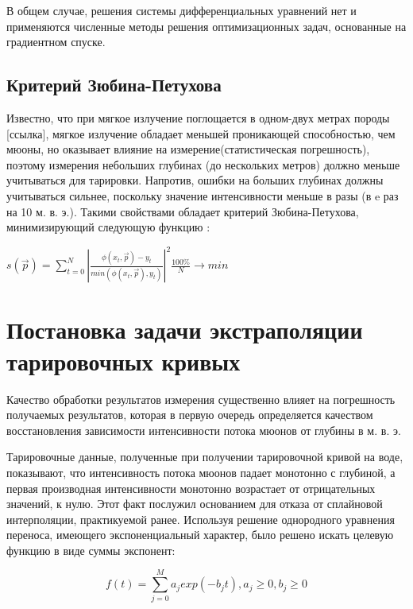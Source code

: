 В общем случае, решения системы дифференциальных уравнений нет и 
применяются численные методы решения оптимизационных задач, 
основанные на градиентном спуске.

\subsection{Критерий Зюбина-Петухова}
Известно, что при мягкое излучение поглощается в одном-двух метрах породы [ссылка], мягкое излучение обладает
меньшей проникающей способностью, чем мюоны, но оказывает влияние на измерение(статистическая погрешность),
поэтому измерения небольших глубинах (до нескольких метров) должно меньше учитываться для тарировки. 
Напротив, ошибки на больших глубинах должны учитываться сильнее, поскольку значение интенсивности  меньше в разы
(в e раз на 10 м. в. э.). Такими свойствами обладает критерий Зюбина-Петухова, минимизирующий следующую функцию : 

\begin{center}
$s(\vec{p}) = \displaystyle\sum_{t=0}^N \left|
\frac{\phi(x_t, \vec{p}) - y_t}{min(\phi(x_t, \vec{p}), y_t)}\right|^2 
\frac{100\%}{N} \rightarrow min$ %
 
\end{center}


\section{Постановка задачи экстраполяции тарировочных кривых}\label{sect2_2}

Качество обработки результатов измерения существенно влияет на погрешность
получаемых результатов, которая в первую очередь определяется
качеством восстановления зависимости интенсивности потока мюонов от глубины в м. в. э.

Тарировочные данные, полученные при получении тарировочной кривой на воде, 
показывают, что интенсивность потока мюонов падает монотонно с
глубиной, а первая производная интенсивности монотонно возрастает 
от отрицательных значений, к нулю. Этот факт послужил основанием для отказа 
от сплайновой интерполяции, практикуемой ранее. Используя решение 
однородного уравнения переноса, имеющего экспоненциальный характер, было решено
искать целевую функцию в виде суммы экспонент:

\begin{equation}
  \label{eq:approximation}
  \mathit{ f(t)  = \displaystyle\sum_{j=0}^M a_j exp(-b_j t) , a_j \geq 0 , b_j \geq 0  }  
\end{equation}



